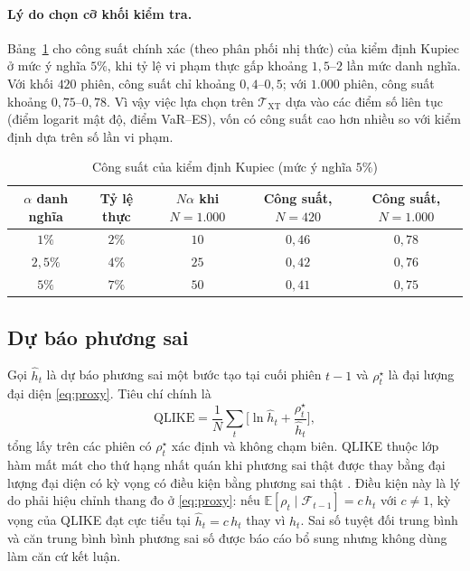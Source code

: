\documentclass[12pt,a4paper]{article}
\theoremstyle{definition}
\theoremstyle{remark}
\newcommand{\E}{\mathbb{E}}
\newcommand{\QLIKE}{\mathrm{QLIKE}}
\newcommand{\Fcal}{\mathcal{F}}
\begin{document}
\paragraph{Lý do chọn cỡ khối kiểm tra.} Bảng~\ref{tab:congsuat} cho công suất chính xác (theo phân phối nhị thức) của kiểm định Kupiec ở mức ý nghĩa $5\%$, khi tỷ lệ vi phạm thực gấp khoảng $1{,}5$--$2$ lần mức danh nghĩa. Với khối $420$ phiên, công suất chỉ khoảng $0{,}4$--$0{,}5$; với $1.000$ phiên, công suất khoảng $0{,}75$--$0{,}78$. Vì vậy việc lựa chọn trên $\mathcal T_{\mathrm{XT}}$ dựa vào các điểm số liên tục (điểm logarit mật độ, điểm VaR--ES), vốn có công suất cao hơn nhiều so với kiểm định dựa trên số lần vi phạm.

\begin{table}[h]
\centering
\caption{Công suất của kiểm định Kupiec (mức ý nghĩa $5\%$)}\label{tab:congsuat}
\begin{tabular}{@{}ccccc@{}}
\toprule
$\alpha$ danh nghĩa & Tỷ lệ thực & $N\alpha$ khi $N=1.000$ & Công suất, $N=420$ & Công suất, $N=1.000$ \\
\midrule
$1\%$ & $2\%$ & $10$ & $0{,}46$ & $0{,}78$ \\
$2{,}5\%$ & $4\%$ & $25$ & $0{,}42$ & $0{,}76$ \\
$5\%$ & $7\%$ & $50$ & $0{,}41$ & $0{,}75$ \\
\bottomrule
\end{tabular}
\end{table}

\subsection{Dự báo phương sai}

Gọi $\hat h_t$ là dự báo phương sai một bước tạo tại cuối phiên $t-1$ và $\rho^{\star}_t$ là đại lượng đại diện \eqref{eq:proxy}. Tiêu chí chính là
\begin{equation}
\QLIKE=\frac1N\sum_{t}\Big[\ln\hat h_t+\frac{\rho^{\star}_t}{\hat h_t}\Big],
\end{equation}
tổng lấy trên các phiên có $\rho^{\star}_t$ xác định và không chạm biên. QLIKE thuộc lớp hàm mất mát cho thứ hạng nhất quán khi phương sai thật được thay bằng đại lượng đại diện có kỳ vọng có điều kiện bằng phương sai thật \cite{patton2011}. Điều kiện này là lý do phải hiệu chỉnh thang đo ở \eqref{eq:proxy}: nếu $\E[\rho_t\mid\Fcal_{t-1}]=c\,h_t$ với $c\ne1$, kỳ vọng của QLIKE đạt cực tiểu tại $\hat h_t=c\,h_t$ thay vì $h_t$. Sai số tuyệt đối trung bình và căn trung bình bình phương sai số được báo cáo bổ sung nhưng không dùng làm căn cứ kết luận.
\end{document}
